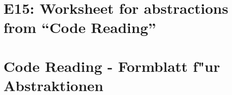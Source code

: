 
\thispagestyle{empty}
\ifenglish
\section*{E15: Worksheet for abstractions from ``Code Reading''}

\fi
\ifgerman
\section*{Code Reading - Formblatt f"ur Abstraktionen}

\fi


